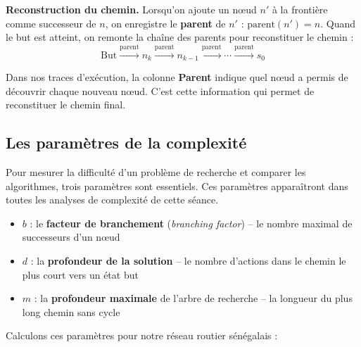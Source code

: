 \documentclass[11pt,a4paper]{article}
\begin{document}
\textbf{Reconstruction du chemin.} Lorsqu'on ajoute un nœud $n'$ à la frontière comme successeur de $n$, on enregistre le \textbf{parent} de $n'$ : $\text{parent}(n') = n$. Quand le but est atteint, on remonte la chaîne des parents pour reconstituer le chemin :
$$\text{But} \xrightarrow{\text{parent}} n_k \xrightarrow{\text{parent}} n_{k-1} \xrightarrow{\text{parent}} \cdots \xrightarrow{\text{parent}} s_0$$

Dans nos traces d'exécution, la colonne \textbf{Parent} indique quel nœud a permis de découvrir chaque nouveau nœud. C'est cette information qui permet de reconstituer le chemin final.

\subsection{Les paramètres de la complexité}

Pour mesurer la difficulté d'un problème de recherche et comparer les algorithmes, trois paramètres sont essentiels. Ces paramètres apparaîtront dans toutes les analyses de complexité de cette séance.

\begin{definitionbox}
\begin{itemize}
    \item $b$ : le \textbf{facteur de branchement} (\textit{branching factor}) -- le nombre maximal de successeurs d'un nœud
    \item $d$ : la \textbf{profondeur de la solution} -- le nombre d'actions dans le chemin le plus court vers un état but
    \item $m$ : la \textbf{profondeur maximale} de l'arbre de recherche -- la longueur du plus long chemin sans cycle
\end{itemize}
\end{definitionbox}

Calculons ces paramètres pour notre réseau routier sénégalais :
\end{document}
